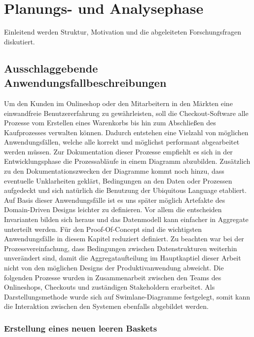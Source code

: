 

\chapter{Planungs- und Analysephase}

Einleitend werden Struktur, Motivation und die abgeleiteten Forschungsfragen diskutiert. %

\section{Ausschlaggebende Anwendungsfallbeschreibungen}


Um den Kunden im Onlineshop oder den Mitarbeitern in den Märkten eine einwandfreie Benutzererfahrung zu gewährleisten, soll die Checkout-Software alle Prozesse vom Erstellen eines Warenkorbs bis hin zum Abschließen des Kaufprozesses verwalten können. Dadurch entstehen eine Vielzahl von möglichen Anwendungsfällen, welche alle korrekt und möglichst performant abgearbeitet werden müssen. Zur Dokumentation dieser Prozesse empfiehlt es sich in der Entwicklungsphase die Prozessabläufe in einem Diagramm abzubilden. Zusätzlich zu den Dokumentationszwecken der Diagramme kommt noch hinzu, dass eventuelle Unklarheiten geklärt, Bedingungen an den Daten oder Prozessen aufgedeckt und sich natürlich die Benutzung der Ubiquitous Language etabliert. Auf Basis dieser Anwendungsfälle ist es uns später möglich Artefakte des Domain-Driven Designs leichter zu definieren. Vor allem die entscheiden Invarianten bilden sich heraus und das Datenmodell kann einfacher in Aggregate unterteilt werden. Für den Proof-Of-Concept sind die wichtigsten Anwendungsfälle in diesem Kapitel reduziert definiert. Zu beachten war bei der Prozessvereinfachung, dass Bedingungen zwischen Datenstrukturen weiterhin unverändert sind, damit die Aggregataufteilung im Hauptkaptiel dieser Arbeit nicht von den möglichen Designs der Produktivanwendung abweicht. Die folgenden Prozesse wurden in Zusammenarbeit zwischen den Teams des Onlineshops, Checkouts und zuständigen Stakeholdern erarbeitet. Als Darstellungsmethode wurde sich auf Swimlane-Diagramme festgelegt, somit kann die Interaktion zwischen den Systemen ebenfalls abgebildet werden.

\subsection{Erstellung eines neuen leeren Baskets}


